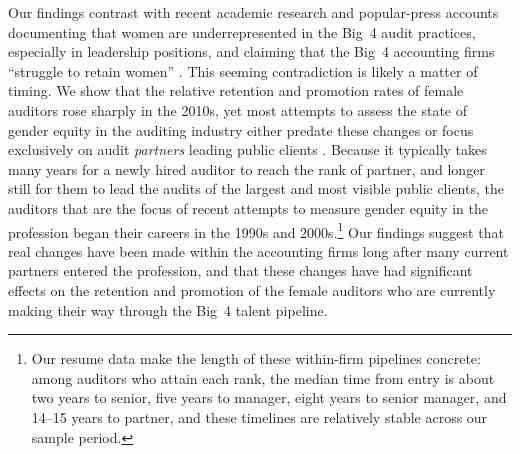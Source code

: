\documentclass[11pt]{article}
\begin{document}
    Our findings contrast with recent academic research and popular-press accounts documenting that women are underrepresented in the Big~4 audit practices, especially in leadership positions, and claiming that the Big~4 accounting firms ``struggle to retain women'' \parencite{kornbergerChangingGenderDomination2010,burkeAuditPartnerIdentification2019, leeAuditPartnerAssignments2019, rapoportWomenRarelyRun2018, khavisDoesGenderComposition2025}. This seeming contradiction is likely a matter of timing. We show that the relative retention and promotion rates of female auditors rose sharply in the 2010s, yet most attempts to assess the state of gender equity in the auditing industry either predate these changes \parencite{kornbergerChangingGenderDomination2010, daltonWomenManagersPartners1997,anderson-goughHelpingThemForget2005} or focus exclusively on audit \textit{partners} leading public clients \parencite{burkeAuditPartnerIdentification2019, leeAuditPartnerAssignments2019, rapoportWomenRarelyRun2018}. Because it typically takes many years for a newly hired auditor to reach the rank of partner, and longer still for them to lead the audits of the largest and most visible public clients, the auditors that are the focus of recent attempts to measure gender equity in the profession began their careers in the 1990s and 2000s.\footnote{Our resume data make the length of these within-firm pipelines concrete: among auditors who attain each rank, the median time from entry is about two years to senior, five years to manager, eight years to senior manager, and 14--15 years to partner, and these timelines are relatively stable across our sample period.} Our findings suggest that real changes have been made within the accounting firms long after many current partners entered the profession, and that these changes have had significant effects on the retention and promotion of the female auditors who are currently making their way through the Big~4 talent pipeline.
    
\end{document}
